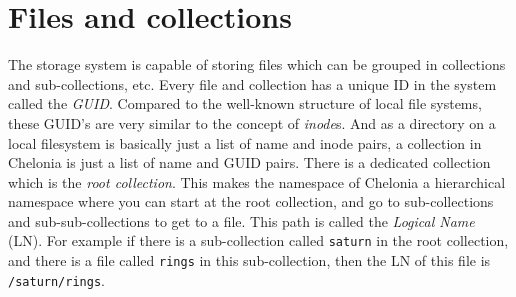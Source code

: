 \documentclass{book}
\begin{document}
\begin{figure}[ht]
\end{figure}

\section{Files and collections} %
\label{sec:files_and_collections}

The storage system is capable of storing files which can be grouped in collections and sub-collections, etc.
Every file and collection has a unique ID in the system called the \emph{GUID}. Compared to the well-known structure of local file systems, these GUID's are very similar to the concept of \emph{inode}s. And as a directory on a local filesystem is basically just a list of name and inode pairs, a collection in Chelonia is just a list of name and GUID pairs. There is a dedicated collection which is the \emph{root collection}. This makes the namespace of Chelonia a hierarchical namespace where you can start at the root collection, and go to sub-collections and sub-sub-collections to get to a file. This path is called the \emph{Logical Name} (LN). For example if there is a sub-collection called \verb!saturn! in the root collection, and there is a file called \verb!rings! in this sub-collection, then the LN of this file is \verb!/saturn/rings!.
\end{document}
